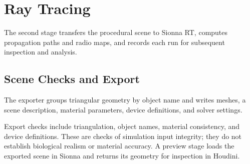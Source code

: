 \section{Ray Tracing}
\label{sec:raytracing}
The second stage transfers the procedural scene to Sionna RT, computes propagation paths and radio maps, and records each run for subsequent inspection and analysis.




\subsection{Scene Checks and Export}
\label{sec:scene}
The exporter groups triangular geometry by object name and writes meshes, a scene description, material parameters, device definitions, and solver settings.

Export checks include triangulation, object names, material consistency, and device definitions. These are checks of simulation input integrity; they do not establish biological realism or material accuracy. A preview stage loads the exported scene in Sionna and returns its geometry for inspection in Houdini.





